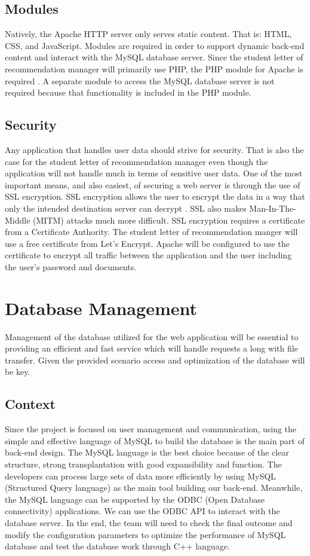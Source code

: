 \documentclass[onecolumn, draftclsnofoot,10pt, compsoc]{IEEEtran}
\begin{document}
\subsection{Modules}
Natively, the Apache HTTP server only serves static content. That is: HTML, CSS, and JavaScript. Modules are required in order to support dynamic back-end content and interact with the MySQL database server. Since the student letter of recommendation manager will primarily use PHP, the PHP module for Apache is required \cite{apachephp}. A separate module to access the MySQL database server is not required because that functionality is included in the PHP module.

\subsection{Security}
Any application that handles user data should strive for security. That is also the case for the student letter of recommendation manager even though the application will not handle much in terms of sensitive user data. One of the most important means, and also easiest, of securing a web server is through the use of SSL encryption. SSL encryption allows the user to encrypt the data in a way that only the intended destination server can decrypt \cite{letsencrypt}. SSL also makes Man-In-The-Middle (MITM) attacks much more difficult. SSL encryption requires a certificate from a Certificate Authority. The student letter of recommendation manger will use a free certificate from Let's Encrypt. Apache will be configured to use the certificate to encrypt all traffic between the application and the user including the user's password and documents.


\section{Database Management}
Management of the database utilized for the web application will be essential to providing an efficient and fast service which will handle requests a long with file transfer. Given the provided scenario access and optimization of the database will be key. 

\subsection{Context}
Since the project is focused on user management and communication, using the simple and effective language of MySQL to build the database is the main part of back-end design. The MySQL language is the best choice because of the clear structure, strong transplantation with good expansibility and function. The developers can process large sets of data more efficiently by using MySQL (Structured Query language) as the main tool building our back-end. 
Meanwhile, the MySQL language can be supported by the ODBC (Open Database connectivity) applications. We can use the ODBC API to interact with the database server. In the end, the team will need to check the final outcome and modify the configuration parameters to optimize the performance of MySQL database and test the database work through C++ language.
\end{document}
